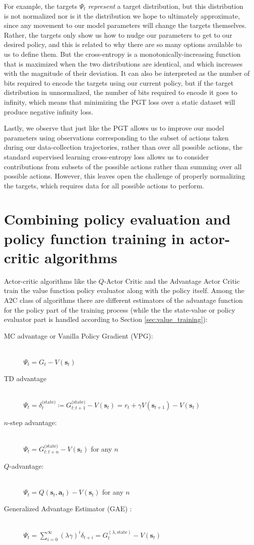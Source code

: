 \documentclass{article}
\begin{document}
For example, the targets $\Psi_t$ \textit{represent} a target distribution, but this distribution is not normalized nor is it the distribution we hope to ultimately approximate, since any movement to our model parameters will change the targets themselves. Rather, the targets only show us how to nudge our parameters to get to our desired policy, and this is related to why there are so many options available to us to define them. But the cross-entropy is a monotonically-increasing function that is maximized when the two distributions are identical, and which increases with the magnitude of their deviation. It can also be interpreted as the number of bits required to encode the targets using our current policy, but if the target distribution in unnormalized, the number of bits required to encode it goes to infinity, which means that minimizing the PGT loss over a static dataset will produce negative infinity loss.

Lastly, we observe that just like the PGT allows us to improve our model parameters using observations corresponding to the subset of actions taken during our data-collection trajectories, rather than over all possible actions, the standard supervised learning cross-entropy loss allows us to consider contributions from subsets of the possible actions rather than summing over all possible actions. However,  this leaves open the challenge of properly normalizing the targets, which requires data for all possible actions to perform.

\section{Combining policy evaluation and policy function training in actor-critic algorithms}
Actor-critic algorithms like the $Q$-Actor Critic and the Advantage Actor Critic train the value function policy evaluator along with the policy itself. Among the A2C class of algorithms there are different estimators of the advantage function for the policy part of the training process (while the the state-value or policy evaluator part is handled according to Section \ref{sec:value_training}):
\begin{description}
\item[MC advantage or Vanilla Policy Gradient (VPG):]\hfill \\
$\Psi_t =G_t-V(\mathbf{s}_t)$
\item[TD advantage]\hfill \\
$\Psi_t =\delta_t^\text{(state)}\coloneqq G_{t:t+1}^\text{(state)}-V(\mathbf{s}_t)= r_t+\gamma V(\mathbf{s}_{t+1})-V(\mathbf{s}_t)$
\item[$n$-step advantage:]\hfill \\
$\Psi_t =G_{t:t+n}^\text{(state)}-V(\mathbf{s}_t)$ for any $n$
\item[$Q$-advantage:]\hfill \\
$\Psi_t =Q(\mathbf{s}_t,\mathbf{a}_t)-V(\mathbf{s}_t)$ for any $n$
\item[Generalized Advantage Estimator (GAE) :]\hfill \\ 
$\Psi_t=\sum_{i=0}^\infty(\lambda\gamma)^i\delta_{t+i}=G^{(\lambda,\text{state})}_t-V(\mathbf{s}_{t})$
\end{description}
\end{document}
